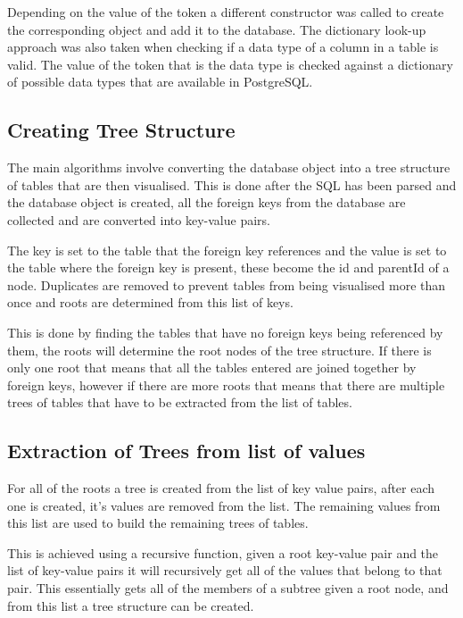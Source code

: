 Depending on the value of the token a different constructor was called to create the corresponding object and add it to the database. The dictionary look-up approach was also taken when checking if a data type of a column in a table is valid. The value of the token that is the data type is checked against a dictionary of possible data types that are available in PostgreSQL.

\subsection{Creating Tree Structure}

The main algorithms involve converting the database object into a tree structure of tables that are then visualised. This is done after the SQL has been parsed and the database object is created, all the foreign keys from the database are collected and are converted into key-value pairs. 

The key is set to the table that the foreign key references and the value is set to the table where the foreign key is present, these become the id and parentId of a node. Duplicates are removed to prevent tables from being visualised more than once and roots are determined from this list of keys. 

This is done by finding the tables that have no foreign keys being referenced by them, the roots will determine the root nodes of the tree structure. If there is only one root that means that all the tables entered are joined together by foreign keys, however if there are more roots that means that there are multiple trees of tables that have to be extracted from the list of tables. 

\subsection{Extraction of Trees from list of values}

For all of the roots a tree is created from the list of key value pairs, after each one is created, it's values are removed from the list. The remaining values from this list are used to build the remaining trees of tables. 

This is achieved using a recursive function, given a root key-value pair and the list of key-value pairs it will recursively get all of the values that belong to that pair. This essentially gets all of the members of a subtree given a root node, and from this list a tree structure can be created. 

